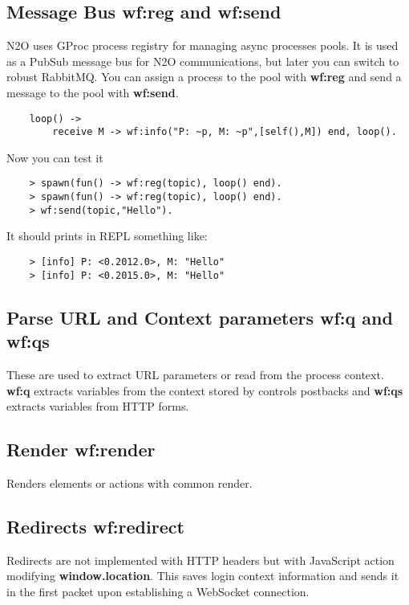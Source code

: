 \subsection{Message Bus {\bf wf:reg} and {\bf wf:send}}
N2O uses GProc process registry for managing async processes pools.
It is used as a PubSub message bus for N2O communications, but later you can switch to robust RabbitMQ.
You can assign a process to the pool with {\bf wf:reg} and send a message to the pool with {\bf wf:send}.

\vspace{1\baselineskip}
\begin{lstlisting}
    loop() ->
        receive M -> wf:info("P: ~p, M: ~p",[self(),M]) end, loop().
\end{lstlisting}

Now you can test it

\begin{lstlisting}
    > spawn(fun() -> wf:reg(topic), loop() end).
    > spawn(fun() -> wf:reg(topic), loop() end).
    > wf:send(topic,"Hello").
\end{lstlisting}

It should prints in REPL something like:

\begin{lstlisting}
    > [info] P: <0.2012.0>, M: "Hello"
    > [info] P: <0.2015.0>, M: "Hello"
\end{lstlisting}

\subsection{Parse URL and Context parameters {\bf wf:q} and {\bf wf:qs}}
These are used to extract URL parameters or read from the process context. {\bf wf:q} extracts variables
from the context stored by controls postbacks and {\bf wf:qs} extracts variables from HTTP forms.

\subsection{Render {\bf wf:render}}
Renders elements or actions with common render.

\subsection{Redirects {\bf wf:redirect}}
Redirects are not implemented with HTTP headers but with JavaScript action modifying {\bf window.location}.
This saves login context information and sends it in the first packet upon establishing a WebSocket connection.

